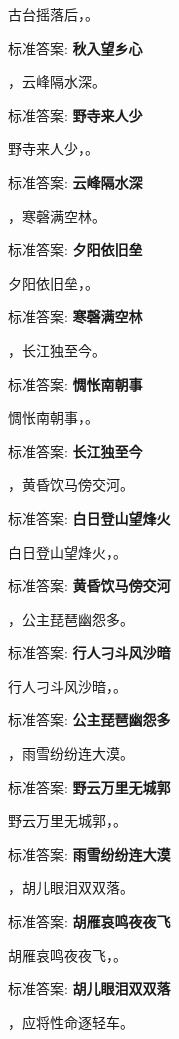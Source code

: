 \documentclass[12pt, a4paper, addpoints]{exam}
\begin{document}
\begin{questions}
\question[1] 古台摇落后，\uline{\qquad\qquad\qquad}。

标准答案: \textbf{秋入望乡心}

\question[1] \uline{\qquad\qquad\qquad}，云峰隔水深。

标准答案: \textbf{野寺来人少}

\question[1] 野寺来人少，\uline{\qquad\qquad\qquad}。

标准答案: \textbf{云峰隔水深}

\question[1] \uline{\qquad\qquad\qquad}，寒磬满空林。

标准答案: \textbf{夕阳依旧垒}

\question[1] 夕阳依旧垒，\uline{\qquad\qquad\qquad}。

标准答案: \textbf{寒磬满空林}

\question[1] \uline{\qquad\qquad\qquad}，长江独至今。

标准答案: \textbf{惆怅南朝事}

\question[1] 惆怅南朝事，\uline{\qquad\qquad\qquad}。

标准答案: \textbf{长江独至今}

\question[1] \uline{\qquad\qquad\qquad}，黄昏饮马傍交河。

标准答案: \textbf{白日登山望烽火}

\question[1] 白日登山望烽火，\uline{\qquad\qquad\qquad}。

标准答案: \textbf{黄昏饮马傍交河}

\question[1] \uline{\qquad\qquad\qquad}，公主琵琶幽怨多。

标准答案: \textbf{行人刁斗风沙暗}

\question[1] 行人刁斗风沙暗，\uline{\qquad\qquad\qquad}。

标准答案: \textbf{公主琵琶幽怨多}

\question[1] \uline{\qquad\qquad\qquad}，雨雪纷纷连大漠。

标准答案: \textbf{野云万里无城郭}

\question[1] 野云万里无城郭，\uline{\qquad\qquad\qquad}。

标准答案: \textbf{雨雪纷纷连大漠}

\question[1] \uline{\qquad\qquad\qquad}，胡儿眼泪双双落。

标准答案: \textbf{胡雁哀鸣夜夜飞}

\question[1] 胡雁哀鸣夜夜飞，\uline{\qquad\qquad\qquad}。

标准答案: \textbf{胡儿眼泪双双落}

\question[1] \uline{\qquad\qquad\qquad}，应将性命逐轻车。


\end{questions}
\end{document}
